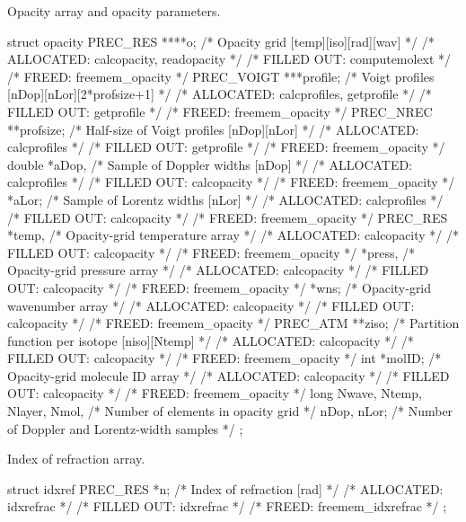 \documentclass[letterpaper,12pt]{article}
\begin{document}
\noindent \newline
Opacity array and opacity parameters.
\begin{plain}
struct opacity{
  PREC_RES ****o;         /* Opacity grid [temp][iso][rad][wav]             */
    /* ALLOCATED:	calcopacity, readopacity			    */
    /* FILLED OUT:      computemolext					    */
    /* FREED: 		freemem_opacity					    */ 
  PREC_VOIGT ***profile;  /* Voigt profiles [nDop][nLor][2*profsize+1]      */
    /* ALLOCATED:	calcprofiles, getprofile			    */
    /* FILLED OUT:	getprofile					    */
    /* FREED: 		freemem_opacity					    */ 
  PREC_NREC **profsize;   /* Half-size of Voigt profiles [nDop][nLor]       */
    /* ALLOCATED:	calcprofiles					    */
    /* FILLED OUT:	getprofile					    */
    /* FREED: 		freemem_opacity					    */ 
  double *aDop,           /* Sample of Doppler widths [nDop]                */
    /* ALLOCATED:	calcprofiles					    */
    /* FILLED OUT:	calcopacity					    */
    /* FREED: 		freemem_opacity					    */ 
         *aLor;           /* Sample of Lorentz widths [nLor]                */
    /* ALLOCATED:	calcprofiles					    */
    /* FILLED OUT:	calcopacity					    */
    /* FREED: 		freemem_opacity					    */ 
  PREC_RES *temp,         /* Opacity-grid temperature array                 */
    /* ALLOCATED:	calcopacity					    */
    /* FILLED OUT:	calcopacity					    */
    /* FREED: 		freemem_opacity					    */ 
           *press,        /* Opacity-grid pressure array                    */
    /* ALLOCATED:	calcopacity					    */
    /* FILLED OUT:	calcopacity					    */
    /* FREED: 		freemem_opacity					    */ 
           *wns;          /* Opacity-grid wavenumber array                  */
    /* ALLOCATED:	calcopacity					    */
    /* FILLED OUT:	calcopacity					    */
    /* FREED: 		freemem_opacity					    */ 
  PREC_ATM **ziso;        /* Partition function per isotope [niso][Ntemp]   */
    /* ALLOCATED:	calcopacity					    */
    /* FILLED OUT:	calcopacity					    */
    /* FREED: 		freemem_opacity					    */ 
  int *molID;             /* Opacity-grid molecule ID array                 */
    /* ALLOCATED:	calcopacity					    */
    /* FILLED OUT:	calcopacity					    */
    /* FREED: 		freemem_opacity					    */ 
  long Nwave, Ntemp, Nlayer, Nmol, /* Number of elements in opacity grid    */
      nDop, nLor;         /* Number of Doppler and Lorentz-width samples    */
};
\end{plain}

\noindent \newline
Index of refraction array.
\begin{plain}
struct idxref{
  PREC_RES *n;   /* Index of refraction [rad]                               */
    /* ALLOCATED:	idxrefrac					    */
    /* FILLED OUT:	idxrefrac					    */
    /* FREED: 		freemem_idxrefrac				    */ 
};
\end{plain}
\end{document}
